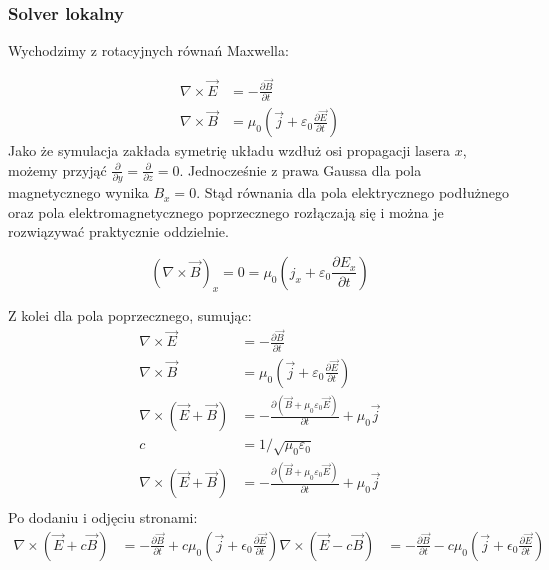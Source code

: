 \subsubsection{Solver lokalny}
Wychodzimy z rotacyjnych równań Maxwella:

\begin{align}
    \nabla \times \vec{E} &= -\frac{\partial \vec{B}}{\partial t} \\
    \nabla \times \vec{B} &= \mu_0 (\vec{j} + \varepsilon_0 \frac{\partial \vec{E}}{\partial t})
    \label{eqn:Maxwell-rotation-derivation}
 \end{align}
Jako że symulacja zakłada symetrię układu wzdłuż osi propagacji lasera $x$,
możemy przyjąć $\frac{\partial}{\partial y} = \frac{\partial}{\partial z} =
0 $.  Jednocześnie z prawa Gaussa dla pola magnetycznego wynika $B_x = 0$.
Stąd równania dla pola elektrycznego podłużnego oraz pola
elektromagnetycznego poprzecznego rozłączają się i można je rozwiązywać praktycznie oddzielnie.

\begin{equation}
    (\nabla \times \vec{B})_x = 0 = \mu_0 (j_x + \varepsilon_0 \frac{\partial E_x}{\partial t})
    \label{eqn:longitudinal-field-eq}
 \end{equation}

Z kolei dla pola poprzecznego, sumując:
\begin{align}
    \nabla \times \vec{E} &= -\frac{\partial \vec{B}}{\partial t}\\
    \nabla \times \vec{B} &= \mu_0 (\vec{j} + \varepsilon_0 \frac{\partial \vec{E}}{\partial t})\\
    \nabla \times (\vec{E} + \vec{B}) &= -\frac{\partial (\vec{B} + \mu_0 \varepsilon_0 \vec{E})}{\partial t} + \mu_0 \vec{j}\\
    c &= 1/{\sqrt{\mu_0 \varepsilon_0}}\\
    \nabla \times (\vec{E} + \vec{B}) &= -\frac{\partial (\vec{B} + \mu_0 \varepsilon_0 \vec{E})}{\partial t} + \mu_0 \vec{j}\\
    \label{eqn:perpendicular-field-eq}
\end{align}
Po dodaniu i odjęciu stronami:
\begin{align}
    \nabla \times (\vec{E} + c \vec{B}) &= -\frac{\partial \vec{B}}{\partial t} + c \mu_0 (\vec{j} +  \epsilon_0 \frac{\partial \vec{E}}{\partial t})
    \nabla \times (\vec{E} - c \vec{B}) &= -\frac{\partial \vec{B}}{\partial t} - c \mu_0 (\vec{j} +  \epsilon_0 \frac{\partial \vec{E}}{\partial t})
    \label{eqn:Maxwell-rotation-derivation}
\end{align}

